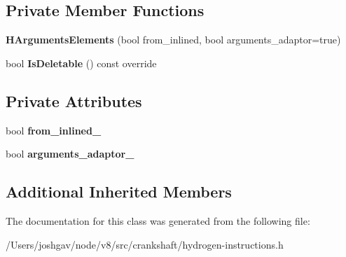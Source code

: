 \subsection*{Private Member Functions}
\begin{DoxyCompactItemize}
\item 
{\bfseries H\+Arguments\+Elements} (bool from\+\_\+inlined, bool arguments\+\_\+adaptor=true)\hypertarget{classv8_1_1internal_1_1_h_arguments_elements_af50cf1035db67f373bce185127400c9d}{}\label{classv8_1_1internal_1_1_h_arguments_elements_af50cf1035db67f373bce185127400c9d}

\item 
bool {\bfseries Is\+Deletable} () const  override\hypertarget{classv8_1_1internal_1_1_h_arguments_elements_a2c602d5a6233d2c1141e4bd7f57b32d2}{}\label{classv8_1_1internal_1_1_h_arguments_elements_a2c602d5a6233d2c1141e4bd7f57b32d2}

\end{DoxyCompactItemize}
\subsection*{Private Attributes}
\begin{DoxyCompactItemize}
\item 
bool {\bfseries from\+\_\+inlined\+\_\+}\hypertarget{classv8_1_1internal_1_1_h_arguments_elements_a2af28033ebd41806b6dcc0627ef6811c}{}\label{classv8_1_1internal_1_1_h_arguments_elements_a2af28033ebd41806b6dcc0627ef6811c}

\item 
bool {\bfseries arguments\+\_\+adaptor\+\_\+}\hypertarget{classv8_1_1internal_1_1_h_arguments_elements_a323a1907b6d3de22b0e811027e4ff797}{}\label{classv8_1_1internal_1_1_h_arguments_elements_a323a1907b6d3de22b0e811027e4ff797}

\end{DoxyCompactItemize}
\subsection*{Additional Inherited Members}


The documentation for this class was generated from the following file\+:\begin{DoxyCompactItemize}
\item 
/\+Users/joshgav/node/v8/src/crankshaft/hydrogen-\/instructions.\+h\end{DoxyCompactItemize}
